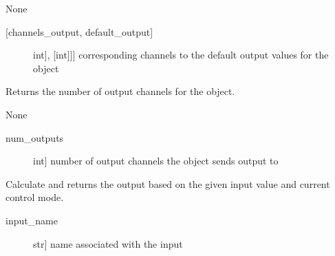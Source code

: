 \documentclass[letterpaper,10pt,english]{sphinxmanual}
\begin{document}
\begin{fulllineitems}
\begin{fulllineitems}
\sphinxAtStartPar
{}

\sphinxAtStartPar
None

\sphinxAtStartPar
{}
\begin{description}
\item[{{[}channels\_output, default\_output{]}}] \leavevmode{[}{[}{[}int{]}, {[}int{]}{]}{]}
\sphinxAtStartPar
corresponding channels to the default output values for the object

\end{description}

\end{fulllineitems}


\begin{fulllineitems}
\label{\detokenize{generic:AnalogMixerOutput.AnalogMixerOutput.get_num_channels}}
\sphinxAtStartPar
Returns the number of output channels for the object.

\sphinxAtStartPar
{}

\sphinxAtStartPar
None

\sphinxAtStartPar
{}
\begin{description}
\item[{num\_outputs}] \leavevmode{[}int{]}
\sphinxAtStartPar
number of output channels the object sends output to

\end{description}

\end{fulllineitems}


\begin{fulllineitems}
\label{\detokenize{generic:AnalogMixerOutput.AnalogMixerOutput.get_output}}
\sphinxAtStartPar
Calculate and returns the output based on the given input value and current control mode.

\sphinxAtStartPar
{}
\begin{description}
\item[{input\_name}] \leavevmode{[}str{]}
\sphinxAtStartPar
name associated with the input


\end{description}
\end{fulllineitems}
\end{fulllineitems}
\end{document}
